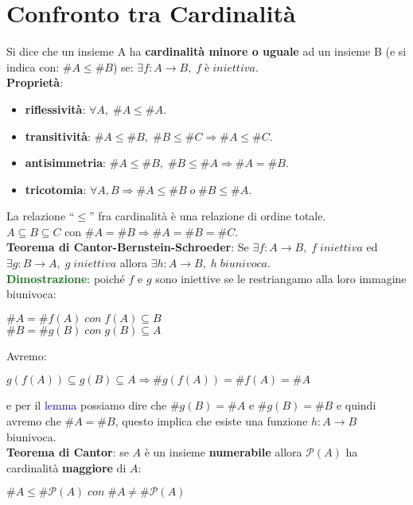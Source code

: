 \section{Confronto tra Cardinalità}
Si dice che un insieme A ha \textbf{cardinalità minore o uguale} ad un insieme B (e si indica con: $\#A \leq \#B$) se: $\exists f : A \rightarrow B, \; f \; è \; iniettiva$. \\
\textbf{Proprietà}:
\begin{itemize}
    \item \textbf{riflessività}: $\forall A, \; \#A \leq \#A$.
    \item \textbf{transitività}: $\#A \leq \#B, \; \#B \leq \#C \Rightarrow \#A \leq \#C$.
    \item \textbf{antisimmetria}: $\#A \leq \#B, \; \#B \leq \#A \Rightarrow \#A = \#B$.
    \item \textbf{tricotomia}: $\forall A, B \Rightarrow \#A \leq \#B \; o \; \#B \leq \#A$.
\end{itemize}
La relazione ``$\leq$'' fra cardinalità è una relazione di ordine totale. \\
$A \subseteq B \subseteq C$ con $\#A = \#B \Rightarrow \#A = \#B = \#C$. \\
\newline
\textbf{Teorema di Cantor-Bernstein-Schroeder}: Se $\exists f : A \rightarrow B, \; f \; iniettiva$ ed $\exists g : B \rightarrow A, \; g \; iniettiva$ allora $\exists h : A \rightarrow B, \; h \; biunivoca$. \\
\textcolor{green}{\textbf{Dimostrazione}}: poiché $f$ e $g$ sono iniettive se le restriangamo alla loro immagine biunivoca:
\begin{center}
    $\#A = \#f(A) \; con \; f(A) \subseteq B$ \\
    $\#B = \#g(B) \; con \; g(B) \subseteq A$ \\
\end{center}
Avremo:
\begin{center}
    $g(f(A)) \subseteq g(B) \subseteq A \Rightarrow \#g(f(A)) = \#f(A) = \#A$
\end{center}
e per il \textcolor{blue}{lemma} possiamo dire che $\#g(B) = \#A$ e $\#g(B) = \#B$ e quindi avremo che $\#A = \#B$, questo implica che esiste una funzione $h : A \rightarrow B$ biunivoca. \\ \newline
\textbf{Teorema di Cantor}: se $A$ è un insieme \textbf{numerabile} allora $\mathcal{P}(A)$ ha cardinalità \textbf{maggiore} di $A$:
\begin{center}
    $\#A \leq \#\mathcal{P}(A) \; con \; \#A \neq \#\mathcal{P}(A)$
\end{center}
